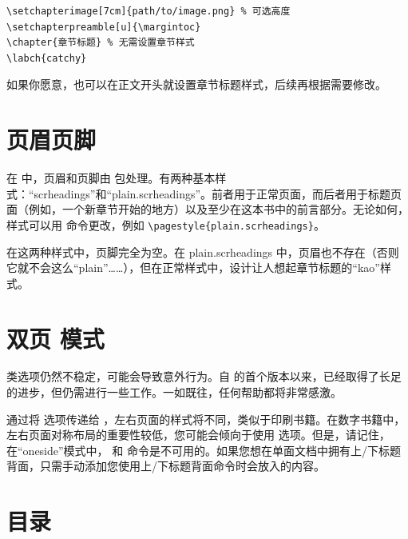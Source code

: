 \begin{lstlisting}
\setchapterimage[7cm]{path/to/image.png} % 可选高度
\setchapterpreamble[u]{\margintoc}
\chapter{章节标题} % 无需设置章节样式
\labch{catchy}
\end{lstlisting}

如果你愿意，也可以在正文开头就设置章节标题样式，后续再根据需要修改。

\section{页眉页脚}

在 \KOMAScript\xspace 中，页眉和页脚由  包处理。有两种基本样式：“scrheadings”和“plain.scrheadings”。前者用于正常页面，而后者用于标题页面（例如，一个新章节开始的地方）以及至少在这本书中的前言部分。无论如何，样式可以用  命令更改，例如 \lstinline|\pagestyle{plain.scrheadings}|。

在这两种样式中，页脚完全为空。在 plain.scrheadings 中，页眉也不存在（否则它就不会这么“plain”……），但在正常样式中，设计让人想起章节标题的“kao”样式。

\section{双页  模式}

\begin{kaobox}[frametitle=To Do]
 类选项仍然不稳定，可能会导致意外行为。自  的首个版本以来，已经取得了长足的进步，但仍需进行一些工作。一如既往，任何帮助都将非常感激。
\end{kaobox}

通过将  选项传递给 ，左右页面的样式将不同，类似于印刷书籍。在数字书籍中，左右页面对称布局的重要性较低，您可能会倾向于使用  选项。但是，请记住，在“oneside”模式中， 和  命令是不可用的。如果您想在单面文档中拥有上/下标题背面，只需手动添加您使用上/下标题背面命令时会放入的内容。

\section{目录}

